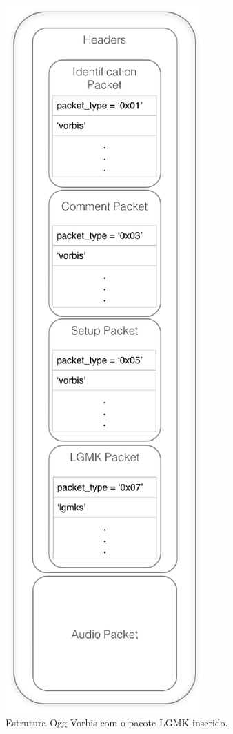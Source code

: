 \begin{figure}[ht]
	\centering
		\includegraphics[keepaspectratio=true,scale=0.8]{figuras/newformat.eps}
	\caption{Estrutura Ogg Vorbis com o pacote LGMK inserido.}
	\label{newformat}
\end{figure}

